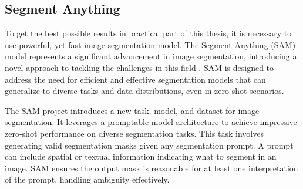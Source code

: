 


  \subsection{Segment Anything}
To get the best possible results in practical part of this thesis, it is necessary to use powerful, yet fast image
segmentation model. The Segment Anything (SAM) model represents a significant advancement in image segmentation,
introducing a novel approach to tackling the challenges in this field \cite{SAM2023}. SAM is designed to address the need for
efficient and effective segmentation models that can generalize to diverse tasks and data distributions, even in zero-shot scenarios.

The SAM project introduces a new task, model, and dataset for image segmentation. It leverages a promptable model
architecture to achieve impressive zero-shot performance on diverse segmentation tasks. This task involves generating valid segmentation masks given any segmentation prompt. A prompt can include spatial or textual information indicating what to segment in an image. SAM ensures the output mask is reasonable for at least one interpretation of the prompt, handling ambiguity effectively.


